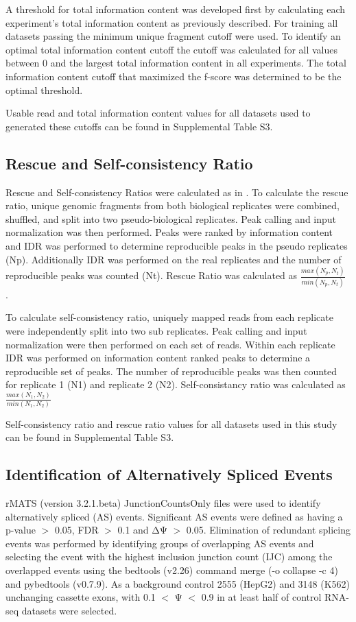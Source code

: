 A threshold for total information content was developed first by calculating each experiment’s total information content as previously described. For training all datasets passing the minimum unique fragment cutoff were used. To identify an optimal total information content cutoff the cutoff was calculated for all values between 0 and the largest total information content in all experiments. The total information content cutoff that maximized the f-score was determined to be the optimal threshold.

Usable read and total information content values for all datasets used to generated these cutoffs can be found in Supplemental Table S3.

\subsection{Rescue and Self-consistency Ratio}
Rescue and Self-consistency Ratios were calculated as in \cite{Landt2012}. To calculate the rescue ratio, unique genomic fragments from both biological replicates were combined, shuffled, and split into two pseudo-biological replicates. Peak calling and input normalization was then performed. Peaks were ranked by information content and IDR was performed to determine reproducible peaks in the pseudo replicates (Np). Additionally IDR was performed on the real replicates and the number of reproducible peaks was counted (Nt). Rescue Ratio was calculated as $\frac{max(N_p,N_t)}{min(N_p,N_t )}$ .

To calculate self-consistency ratio, uniquely mapped reads from each replicate were independently split into two sub replicates. Peak calling and input normalization were then performed on each set of reads. Within each replicate IDR was performed on information content ranked peaks to determine a reproducible set of peaks. The number of reproducible peaks was then counted for replicate 1 (N1) and replicate 2 (N2). Self-consistancy ratio was calculated as $\frac{max(N_1,N_2 )}{min(N_1,N_2)}$

Self-consistency ratio and rescue ratio values for all datasets used in this study can be found in Supplemental Table S3.

\subsection{Identification of Alternatively Spliced Events}
rMATS (version 3.2.1.beta) JunctionCountsOnly files were used to identify alternatively spliced (AS) events. Significant AS events were defined as having a p-value $>$ 0.05, FDR $>$ 0.1 and ΔΨ $>$ 0.05. Elimination of redundant splicing events was performed by identifying groups of overlapping AS events and selecting the event with the highest inclusion junction count (IJC) among the overlapped events using the bedtools (v2.26) command merge (-o collapse -c 4) and pybedtools (v0.7.9). As a background control 2555 (HepG2) and 3148 (K562) unchanging cassette exons, with 0.1 $<$ Ψ $<$ 0.9 in at least half of control RNA-seq datasets were selected.

